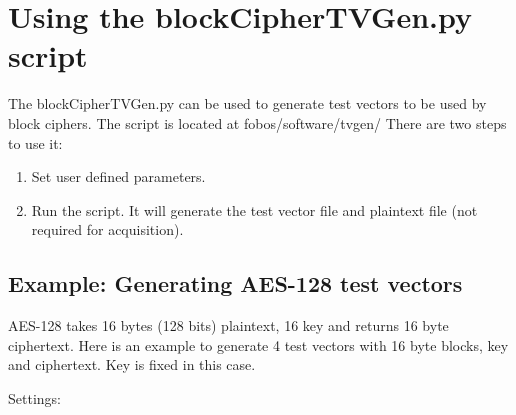 \documentclass[letterpaper,10pt,english]{sphinxmanual}
\begin{document}
\section{Using the blockCipherTVGen.py script}
\label{\detokenize{tvgen:using-the-blockciphertvgen-py-script}}
The blockCipherTVGen.py can be used to generate test vectors to be used by block ciphers. The script is located at fobos/software/tvgen/
There are two steps to use it:
\begin{enumerate}
%
\item {} 
Set user defined parameters.

\item {} 
Run the script. It will generate the test vector file and plaintext file (not required for acquisition).

\end{enumerate}


\subsection{Example: Generating AES-128 test vectors}
\label{\detokenize{tvgen:example-generating-aes-128-test-vectors}}
AES-128 takes 16 bytes (128 bits) plaintext, 16 key and returns 16 byte ciphertext.
Here is an example to generate 4 test vectors with 16 byte blocks, key and ciphertext. Key is fixed in this case.

Settings:

\begin{sphinxVerbatim}[commandchars=\\\{\}]
                             
                              
                              
                            
                     
             
                            
     
\end{sphinxVerbatim}
\end{document}
